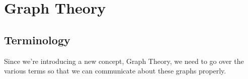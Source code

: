 
\newcommand{\laClass}       {CS 211}
\newcommand{\laSemester}    {Spring 2018}
\newcommand{\laChapter}     {7.1}
\newcommand{\laType}        {Exercise}
\newcommand{\laPoints}      {5}
\newcommand{\laTitle}       {Graph Theory}
\newcommand{\laDate}        {}
\setcounter{chapter}{7}
\setcounter{section}{1}
\addtocounter{section}{-1}

\toggletrue{answerkey}
\togglefalse{answerkey}






    \section{Graph Theory}

    \subsection{Terminology}

        Since we're introducing a new concept, Graph Theory,
        we need to go over the various terms so that we
        can communicate about these graphs properly.

